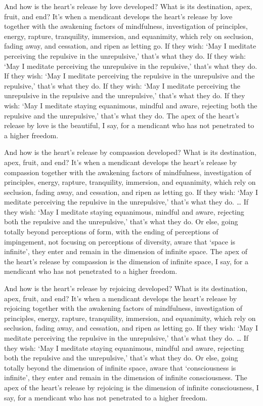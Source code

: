 \documentclass[12pt,openany]{book}%
\begin{document}
And how is the heart’s release by love developed? What is its destination, apex, fruit, and end? It’s when a mendicant develops the heart’s release by love together with the awakening factors of mindfulness, investigation of principles, energy, rapture, tranquility, immersion, and equanimity, which rely on seclusion, fading away, and cessation, and ripen as letting go. If they wish: ‘May I meditate perceiving the repulsive in the unrepulsive,’ that’s what they do. If they wish: ‘May I meditate perceiving the unrepulsive in the repulsive,’ that’s what they do. If they wish: ‘May I meditate perceiving the repulsive in the unrepulsive and the repulsive,’ that’s what they do. If they wish: ‘May I meditate perceiving the unrepulsive in the repulsive and the unrepulsive,’ that’s what they do. If they wish: ‘May I meditate staying equanimous, mindful and aware, rejecting both the repulsive and the unrepulsive,’ that’s what they do. The apex of the heart’s release by love is the beautiful, I say, for a mendicant who has not penetrated to a higher freedom. 

And how is the heart’s release by compassion developed? What is its destination, apex, fruit, and end? It’s when a mendicant develops the heart’s release by compassion together with the awakening factors of mindfulness, investigation of principles, energy, rapture, tranquility, immersion, and equanimity, which rely on seclusion, fading away, and cessation, and ripen as letting go. If they wish: ‘May I meditate perceiving the repulsive in the unrepulsive,’ that’s what they do. … If they wish: ‘May I meditate staying equanimous, mindful and aware, rejecting both the repulsive and the unrepulsive,’ that’s what they do. Or else, going totally beyond perceptions of form, with the ending of perceptions of impingement, not focusing on perceptions of diversity, aware that ‘space is infinite’, they enter and remain in the dimension of infinite space. The apex of the heart’s release by compassion is the dimension of infinite space, I say, for a mendicant who has not penetrated to a higher freedom. 

And how is the heart’s release by rejoicing developed? What is its destination, apex, fruit, and end? It’s when a mendicant develops the heart’s release by rejoicing together with the awakening factors of mindfulness, investigation of principles, energy, rapture, tranquility, immersion, and equanimity, which rely on seclusion, fading away, and cessation, and ripen as letting go. If they wish: ‘May I meditate perceiving the repulsive in the unrepulsive,’ that’s what they do. … If they wish: ‘May I meditate staying equanimous, mindful and aware, rejecting both the repulsive and the unrepulsive,’ that’s what they do. Or else, going totally beyond the dimension of infinite space, aware that ‘consciousness is infinite’, they enter and remain in the dimension of infinite consciousness. The apex of the heart’s release by rejoicing is the dimension of infinite consciousness, I say, for a mendicant who has not penetrated to a higher freedom. 
\end{document}
